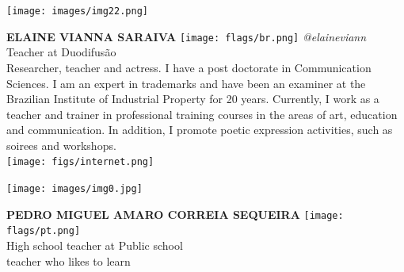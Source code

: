 \documentclass[11pt]{article}
\begin{document}
\noindent
\begin{minipage}{0.3\textwidth}
\centering
\texttt{[image: images/img22.png]}
\end{minipage}
\hfill
\begin{minipage}{0.6\textwidth}\raggedright
\color{color1}\uppercase{\textbf{Elaine Vianna Saraiva}}
\color{color2}\hspace{0.2cm}\texttt{[image: flags/br.png]}
\hspace{0.2cm}\textit{@elaineviann}
\\
Teacher at Duodifusão\\
{\footnotesize 
Researcher, teacher and actress. I have a  post doctorate in Communication Sciences. I am an expert in trademarks and have been an examiner at the Brazilian Institute of Industrial Property  for 20 years. Currently, I work as a teacher and trainer in professional training courses in the areas of art, education and communication.
In addition, I promote poetic expression activities, such as soirees and workshops.}\\
\texttt{[image: figs/internet.png]}
\end{minipage}
\newline\newline\newline

\noindent
\begin{minipage}{0.3\textwidth}
\centering
\texttt{[image: images/img0.jpg]}
\end{minipage}
\hfill
\begin{minipage}{0.6\textwidth}\raggedright
\color{color1}\uppercase{\textbf{Pedro Miguel Amaro Correia Sequeira}}
\color{color2}\hspace{0.2cm}\texttt{[image: flags/pt.png]}
\\
High school teacher at Public school\\
{\footnotesize  teacher who likes to learn}\\
\end{minipage}
\newline\newline\newline
\end{document}
